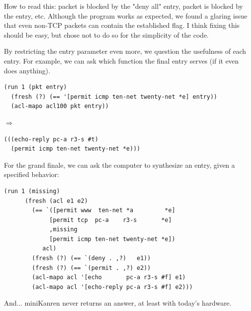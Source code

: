 How to read this: packet  is blocked by the "deny all" entry, packet  is blocked by the  entry, etc. Although the program works as expected, we found a glaring issue that even non-TCP packets can contain the established flag. I think fixing this should be easy, but chose not to do so for the simplicity of the code.

By restricting the entry parameter even more, we question the usefulness of each entry. For example, we can ask which function the final entry serves (if it even does anything).
\begin{lstlisting}
(run 1 (pkt entry)
  (fresh (?) (== '[permit icmp ten-net twenty-net *e] entry))
  (acl-mapo acl100 pkt entry))
\end{lstlisting}
$\Rightarrow$
\begin{lstlisting}
(((echo-reply pc-a r3-s #t)
  (permit icmp ten-net twenty-net *e)))
\end{lstlisting}

For the grand finale, we can ask the computer to synthesize an entry, given a specified behavior:
\begin{lstlisting}
(run 1 (missing)
      (fresh (acl e1 e2)
        (== `([permit www  ten-net *a         *e]
             [permit tcp  pc-a    r3-s       *e]
             ,missing
             [permit icmp ten-net twenty-net *e])
           acl)
        (fresh (?) (== `(deny . ,?)   e1))
        (fresh (?) (== `(permit . ,?) e2))
        (acl-mapo acl '[echo       pc-a r3-s #f] e1)
        (acl-mapo acl '[echo-reply pc-a r3-s #f] e2)))
\end{lstlisting}
And... miniKanren never returns an answer, at least with today's hardware.